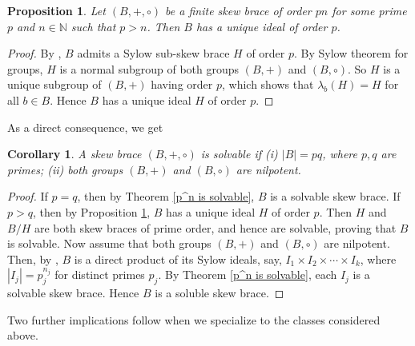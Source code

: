 \documentclass[10pt,a4paper]{amsart}
\numberwithin{equation}{section}
\newtheorem{cor}[equation]{Corollary}
\newtheorem{pro}[equation]{Proposition}
\begin{document}
\begin{pro}\label{pn, uniqe ideal}
     Let $(B,+,\circ)$ be a finite skew brace of order $pn$ for some prime $p$ and $n\in \mathbb{N}$ such that $p>n$. Then $B$ has a unique ideal of order $p$. 
\end{pro}
\begin{proof}
    By \cite{Tru26}, $B$ admits  a Sylow sub-skew brace $H$ of order $p$. By Sylow theorem for groups, $H$ is a normal subgroup of both groups $(B,+)$ and $(B,\circ)$. So $H$ is a unique subgroup of $(B,+)$ having order $p$, which shows that $\lambda_b(H)=H$ for all $b\in B$. Hence $B$ has a unique ideal $H$ of order $p$. 
\end{proof}

As a direct consequence, we get
\begin{cor}\label{pq solvable}
   A skew brace $(B, +, \circ)$ is solvable if (i) $|B|= pq$, where $p, q$ are primes; (ii) both groups $(B,+)$ and $(B,\circ)$ are nilpotent. 
\end{cor}
\begin{proof}
    If $p=q$, then by Theorem \ref{p^n is solvable}, $B$ is a solvable skew brace. If $p>q$, then by Proposition \ref{pn, uniqe ideal}, $B$ has a unique ideal $H$ of order $p$. Then $H$ and $B/H$ are both skew braces of prime order, and hence are solvable, proving that $B$ is solvable.  Now assume that both groups $(B,+)$ and $(B,\circ)$ are nilpotent. Then, by \cite[Corollary 4.3.]{CSV19}, $B$ is a direct product of its Sylow ideals, say, $I_1\times I_2\times \cdots \times I_k $, where $|I_j| = p_j^{n_j}$ for distinct primes  $p_j$. By Theorem \ref{p^n is solvable}, each $I_j$ is a solvable skew brace. Hence $B$ is a soluble skew brace.
\end{proof}

Two further implications follow when we specialize to the classes considered above.
\end{document}
